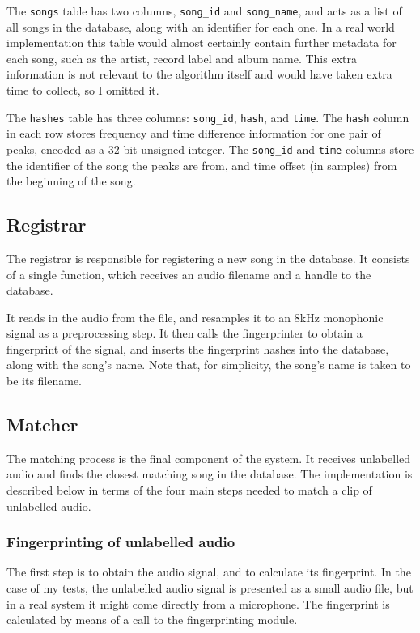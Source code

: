 \documentclass[12pt,a4paper,twoside,openright]{report}
\begin{document}
The \lstinline{songs} table has two columns, \lstinline{song_id} and \lstinline{song_name}, and acts as a list of all songs in the database, along with an identifier for each one. In a real world implementation this table would almost certainly contain further metadata for each song, such as the artist, record label and album name. This extra information is not relevant to the algorithm itself and would have taken extra time to collect, so I omitted it.

The \lstinline{hashes} table has three columns: \lstinline{song_id}, \lstinline{hash}, and \lstinline{time}. The \lstinline{hash} column in each row stores frequency and time difference information for one pair of peaks, encoded as a 32-bit unsigned integer. The \lstinline{song_id} and \lstinline{time} columns store the identifier of the song the peaks are from, and time offset (in samples) from the beginning of the song.


\subsection{Registrar}
\label{shazam:registrar}

The registrar is responsible for registering a new song in the database. It consists of a single function, which receives an audio filename and a handle to the database. 

It reads in the audio from the file, and resamples it to an 8kHz monophonic signal as a preprocessing step. It then calls the fingerprinter to obtain a fingerprint of the signal, and inserts the fingerprint hashes into the database, along with the song's name. Note that, for simplicity, the song's name is taken to be its filename.


\subsection{Matcher}
\label{shazam:matcher}

The matching process is the final component of the system. It receives unlabelled audio and finds the closest matching song in the database. The implementation is described below in terms of the four main steps needed to match a clip of unlabelled audio.

\subsubsection{Fingerprinting of unlabelled audio}

The first step is to obtain the audio signal, and to calculate its fingerprint. In the case of my tests, the unlabelled audio signal is presented as a small audio file, but in a real system it might come directly from a microphone. The fingerprint is calculated by means of a call to the fingerprinting module.
\end{document}
